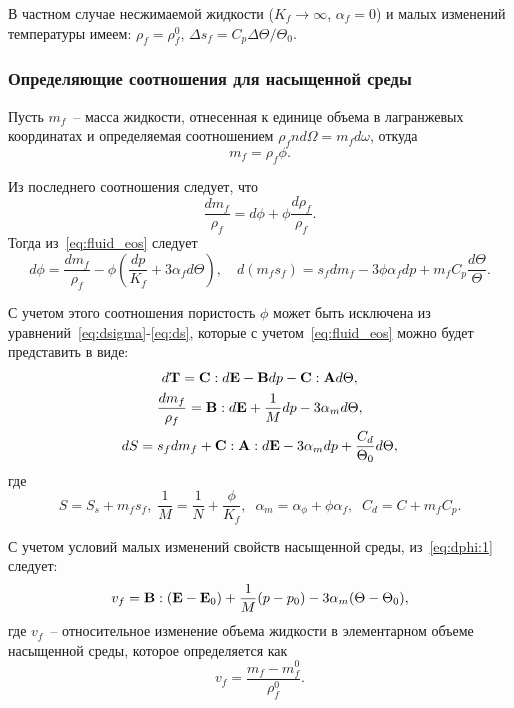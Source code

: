 В частном случае несжимаемой жидкости ($K_f\to\infty$, $\alpha_f = 0$) 
и малых изменений температуры имеем:
$\rho_f = \rho_f^0$, $\Delta s_f = C_p \Delta\Theta/\Theta_0$.
%

\subsubsection{Определяющие соотношения для насыщенной  среды}

Пусть $m_f$~-- масса жидкости, отнесенная к единице объема в
лагранжевых координатах и определяемая соотношением
$\rho_f n d\Omega = m_f d\omega$,
%
откуда 
%
\begin{equation*}
m_f = \rho_f \phi.
\end{equation*}
%

Из последнего соотношения следует, что 
%
\[
\frac{d m_f}{\rho_f} = d\phi + \phi \frac{d \rho_f}{\rho_f}.
\]
%
Тогда из~\eqref{eq:fluid_eos} следует
%
\[
d\phi = \frac{d m_f}{\rho_f} - \phi \left( \frac{d p}{K_f} + 3\alpha_f d\Theta \right),\quad 
d(m_f s_f) = s_f dm_f - 3 \phi \alpha_f dp + m_f C_p \frac{d\Theta}{\Theta}.
\]
%

С учетом этого соотношения пористость $\phi$ может быть исключена из уравнений~\eqref{eq:dsigma}-\eqref{eq:ds},
которые с учетом~\eqref{eq:fluid_eos} можно будет представить в виде:
%
\begin{gather}
d\mathbf{T} = \mathbf{C}:d\mathbf{E} - \mathbf{B}dp - \mathbf{C}:\mathbf{A}d\Theta, \label{eq:dsigma:1}\\
\frac{dm_f}{\rho_f} = \mathbf{B}:d\mathbf{E} + \frac{1}{M} dp - 3\alpha_m d\Theta, \label{eq:dphi:1} \\
dS  = s_f dm_f + \mathbf{C} : \mathbf{A} : d\mathbf{E} - 3\alpha_m dp + \frac{C_d}{\Theta_0}d\Theta\label{eq:ds:1},
\end{gather}
%
где 
%
\[
S = S_s + m_f s_f,\; \frac{1}{M} = \frac{1}{N} + \frac{\phi}{K_f},\;\; 
\alpha_m = \alpha_\phi + \phi \alpha_f,\;\;
C_d = C + m_f C_p.
\]

С учетом условий малых изменений свойств насыщенной среды, из~\eqref{eq:dphi:1} следует:
%
\begin{equation}
\label{eq:vf:1}
v_f = \tn{B}: (\tn{E} - \tn{E}_0) + \frac{1}{M} (p-p_0) - 3\alpha_m (\Theta-\Theta_0), %
\end{equation}
%
где $v_f$~-- относительное изменение объема жидкости в элементарном объеме насыщенной среды, которое определяется как
%
\begin{equation}
\label{eq:vf:2}
v_f = \frac{m_f - m_f^0}{\rho_f^0}.
\end{equation}
%


